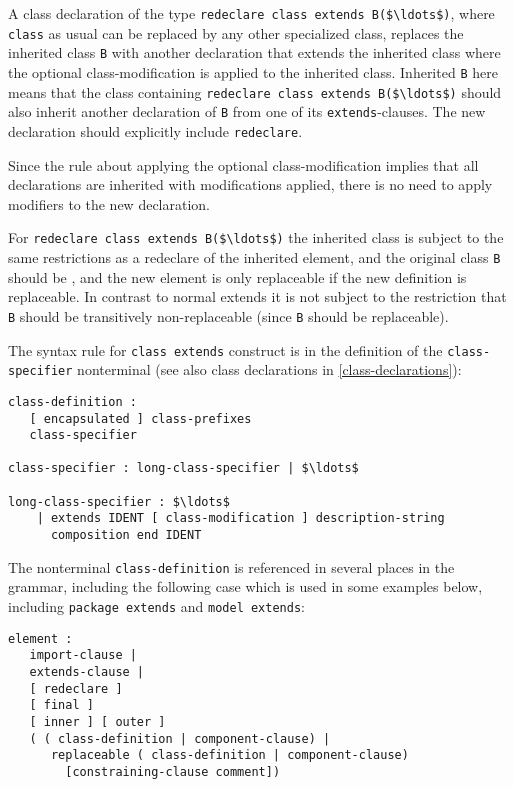 A class declaration of the type \lstinline!redeclare class extends B($\ldots$)!, where \lstinline!class! as usual can be replaced by any other specialized class, replaces the inherited class \lstinline!B! with another declaration that extends the inherited class where the optional class-modification is applied to the inherited class.
Inherited \lstinline!B! here means that the class containing \lstinline!redeclare class extends B($\ldots$)! should also inherit another declaration of \lstinline!B! from one of its \lstinline!extends!-clauses.
The new declaration should explicitly include \lstinline!redeclare!.

\begin{nonnormative}
Since the rule about applying the optional class-modification implies that all declarations are inherited with modifications applied, there is no need
to apply modifiers to the new declaration.
\end{nonnormative}

For \lstinline!redeclare class extends B($\ldots$)! the inherited class is subject to the same restrictions as a redeclare of the inherited element, and the original class \lstinline!B! should be , and the new element is only replaceable if the new definition is replaceable.
In contrast to normal extends it is not subject to the restriction that \lstinline!B! should be transitively non-replaceable (since \lstinline!B! should be replaceable).

The syntax rule for \lstinline!class extends! construct is in the definition of the
\lstinline!class-specifier! nonterminal (see also class declarations in \cref{class-declarations}):
\begin{lstlisting}[language=grammar]
class-definition :
   [ encapsulated ] class-prefixes
   class-specifier

class-specifier : long-class-specifier | $\ldots$

long-class-specifier : $\ldots$
    | extends IDENT [ class-modification ] description-string
      composition end IDENT
\end{lstlisting}
The nonterminal \lstinline!class-definition! is referenced in several places in the
grammar, including the following case which is used in some examples
below, including \lstinline!package extends! and \lstinline!model extends!:
\begin{lstlisting}[language=grammar]
element :
   import-clause |
   extends-clause |
   [ redeclare ]
   [ final ]
   [ inner ] [ outer ]
   ( ( class-definition | component-clause) |
      replaceable ( class-definition | component-clause)
        [constraining-clause comment])
\end{lstlisting}


